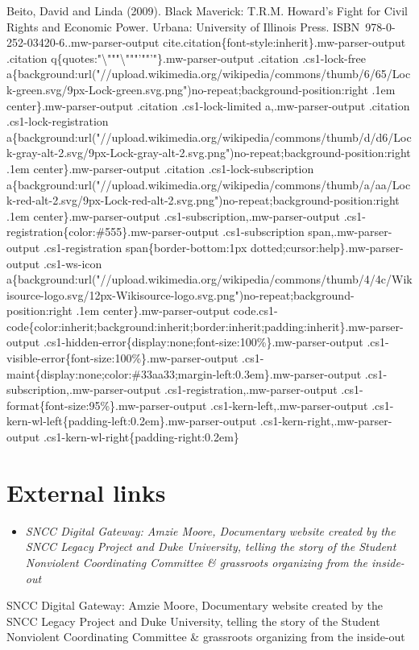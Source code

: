 Beito, David and Linda (2009). Black Maverick: T.R.M. Howard's Fight for
Civil Rights and Economic Power. Urbana: University of Illinois Press.
ISBN~978-0-252-03420-6..mw-parser-output
cite.citation\{font-style:inherit\}.mw-parser-output .citation
q\{quotes:"\textbackslash{}"""\textbackslash{}"""'""'"\}.mw-parser-output
.citation .cs1-lock-free
a\{background:url("//upload.wikimedia.org/wikipedia/commons/thumb/6/65/Lock-green.svg/9px-Lock-green.svg.png")no-repeat;background-position:right
.1em center\}.mw-parser-output .citation .cs1-lock-limited
a,.mw-parser-output .citation .cs1-lock-registration
a\{background:url("//upload.wikimedia.org/wikipedia/commons/thumb/d/d6/Lock-gray-alt-2.svg/9px-Lock-gray-alt-2.svg.png")no-repeat;background-position:right
.1em center\}.mw-parser-output .citation .cs1-lock-subscription
a\{background:url("//upload.wikimedia.org/wikipedia/commons/thumb/a/aa/Lock-red-alt-2.svg/9px-Lock-red-alt-2.svg.png")no-repeat;background-position:right
.1em center\}.mw-parser-output .cs1-subscription,.mw-parser-output
.cs1-registration\{color:\#555\}.mw-parser-output .cs1-subscription
span,.mw-parser-output .cs1-registration span\{border-bottom:1px
dotted;cursor:help\}.mw-parser-output .cs1-ws-icon
a\{background:url("//upload.wikimedia.org/wikipedia/commons/thumb/4/4c/Wikisource-logo.svg/12px-Wikisource-logo.svg.png")no-repeat;background-position:right
.1em center\}.mw-parser-output
code.cs1-code\{color:inherit;background:inherit;border:inherit;padding:inherit\}.mw-parser-output
.cs1-hidden-error\{display:none;font-size:100\%\}.mw-parser-output
.cs1-visible-error\{font-size:100\%\}.mw-parser-output
.cs1-maint\{display:none;color:\#33aa33;margin-left:0.3em\}.mw-parser-output
.cs1-subscription,.mw-parser-output .cs1-registration,.mw-parser-output
.cs1-format\{font-size:95\%\}.mw-parser-output
.cs1-kern-left,.mw-parser-output
.cs1-kern-wl-left\{padding-left:0.2em\}.mw-parser-output
.cs1-kern-right,.mw-parser-output
.cs1-kern-wl-right\{padding-right:0.2em\}

\section{External links}\label{external-links}

\begin{itemize}
\item
  \emph{SNCC Digital Gateway: Amzie Moore, Documentary website created
  by the SNCC Legacy Project and Duke University, telling the story of
  the Student Nonviolent Coordinating Committee \& grassroots organizing
  from the inside-out}
\end{itemize}

SNCC Digital Gateway: Amzie Moore, Documentary website created by the
SNCC Legacy Project and Duke University, telling the story of the
Student Nonviolent Coordinating Committee \& grassroots organizing from
the inside-out
